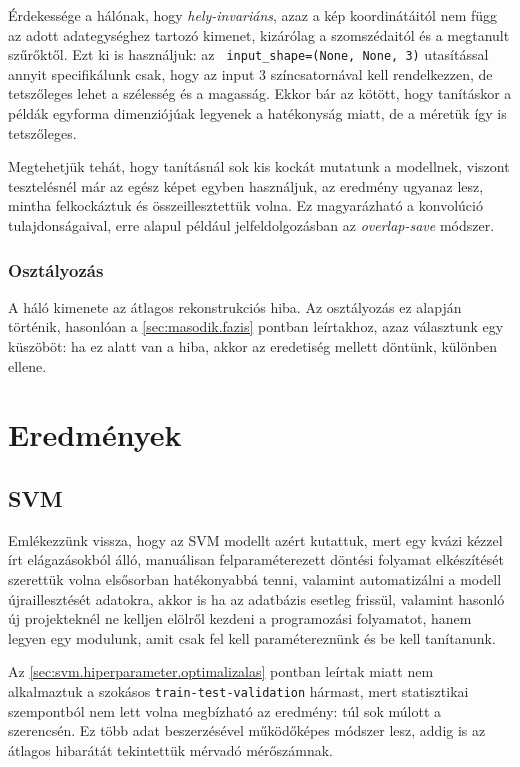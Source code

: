 Érdekessége a hálónak, hogy \textit{hely-invariáns}, azaz a kép koordinátáitól nem függ az adott
adategységhez tartozó kimenet, kizárólag a szomszédaitól és a megtanult szűrőktől.
Ezt ki is használjuk: az \texttt{ input\_shape=(None, None, 3)} utasítással annyit
specifikálunk csak, hogy az input 3 színcsatornával kell rendelkezzen, de tetszőleges
lehet a szélesség és a magasság. Ekkor bár az kötött, hogy tanításkor a példák egyforma 
dimenziójúak legyenek a hatékonyság miatt, de a méretük így is tetszőleges.


Megtehetjük tehát, hogy tanításnál sok kis kockát mutatunk a modellnek, viszont tesztelésnél
már az egész képet egyben használjuk, az eredmény ugyanaz lesz, mintha felkockáztuk 
és összeillesztettük volna. Ez magyarázható a konvolúció 
tulajdonságaival, erre alapul például jelfeldolgozásban az \textit{overlap-save} módszer.



\subsubsection{Osztályozás}

A háló kimenete az átlagos rekonstrukciós hiba. Az osztályozás ez alapján történik,
hasonlóan a \ref{sec:masodik.fazis} pontban leírtakhoz, azaz választunk egy küszöböt:
ha ez alatt van a hiba, akkor az eredetiség mellett döntünk, különben ellene.



\newpage
\section{Eredmények}

\subsection{SVM}
\label{sec:svm.eredmenyek}

Emlékezzünk vissza, hogy az SVM modellt azért kutattuk, mert egy kvázi kézzel írt elágazásokból 
álló, manuálisan felparaméterezett döntési folyamat elkészítését szerettük volna elsősorban
hatékonyabbá tenni, valamint automatizálni a modell újraillesztését adatokra, akkor is ha az 
adatbázis esetleg frissül, valamint hasonló új projekteknél ne kelljen elölről kezdeni a programozási
folyamatot, hanem legyen egy modulunk, amit csak fel kell paramétereznünk és be kell tanítanunk.


Az \ref{sec:svm.hiperparameter.optimalizalas} pontban leírtak miatt nem alkalmaztuk a szokásos 
\texttt{train-test-validation} hármast, mert statisztikai szempontból nem lett volna megbízható
az eredmény: túl sok múlott a szerencsén. Ez több adat beszerzésével működőképes módszer lesz,
addig is az átlagos hibarátát tekintettük mérvadó mérőszámnak.



